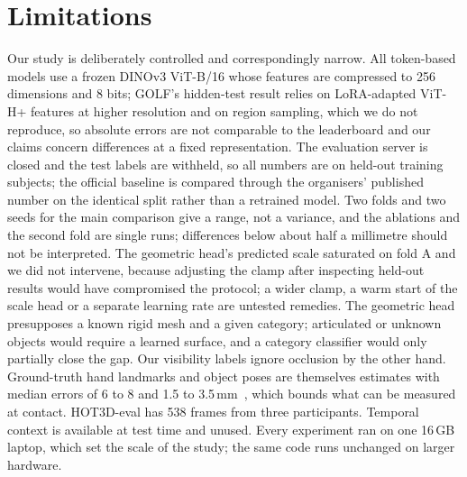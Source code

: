 \section{Limitations}
\label{sec:limitations}

Our study is deliberately controlled and correspondingly narrow. All token-based models use a frozen DINOv3 ViT-B/16 whose features are compressed to 256 dimensions and 8 bits; GOLF's hidden-test result relies on LoRA-adapted ViT-H+ features at higher resolution and on region sampling, which we do not reproduce, so absolute errors are not comparable to the leaderboard and our claims concern differences at a fixed representation. The evaluation server is closed and the test labels are withheld, so all numbers are on held-out training subjects; the official baseline is compared through the organisers' published number on the identical split rather than a retrained model. Two folds and two seeds for the main comparison give a range, not a variance, and the ablations and the second fold are single runs; differences below about half a millimetre should not be interpreted. The geometric head's predicted scale saturated on fold A and we did not intervene, because adjusting the clamp after inspecting held-out results would have compromised the protocol; a wider clamp, a warm start of the scale head or a separate learning rate are untested remedies. The geometric head presupposes a known rigid mesh and a given category; articulated or unknown objects would require a learned surface, and a category classifier would only partially close the gap. Our visibility labels ignore occlusion by the other hand. Ground-truth hand landmarks and object poses are themselves estimates with median errors of 6 to 8 and 1.5 to 3.5\,mm~\cite{rim2026show3d}, which bounds what can be measured at contact. HOT3D-eval has 538 frames from three participants. Temporal context is available at test time and unused. Every experiment ran on one 16\,GB laptop, which set the scale of the study; the same code runs unchanged on larger hardware.
